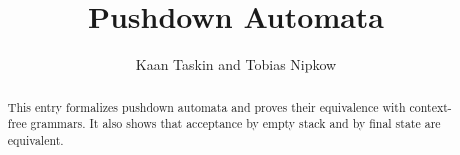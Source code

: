 \documentclass[11pt,a4paper]{article}
\begin{document}
\title{Pushdown Automata}
\author{Kaan Taskin and Tobias Nipkow}
\maketitle

\begin{abstract}
This entry formalizes pushdown automata and proves their equivalence
with context-free grammars. It also shows that acceptance by empty
stack and by final state are equivalent.
\end{abstract}

\tableofcontents





\end{document}

